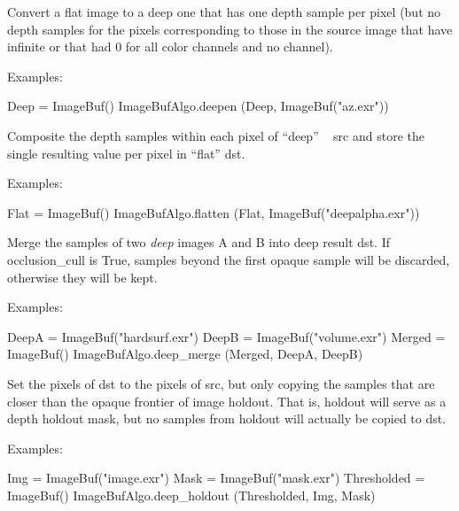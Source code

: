 Convert a flat image to a deep one that has one depth sample per pixel
(but no depth samples for the pixels corresponding to those in the source
image that have infinite  or that had 0 for all color channels and no
 channel).

\smallskip
\noindent Examples:
\begin{code}
    Deep = ImageBuf()
    ImageBufAlgo.deepen (Deep, ImageBuf("az.exr"))
\end{code}
\apiend


  

Composite the depth samples within each pixel of ``deep'' \ImageBuf\ {\cf
src} and store the single  resulting value per pixel in ``flat'' \ImageBuf
{\cf dst}.

\smallskip
\noindent Examples:
\begin{code}
    Flat = ImageBuf()
    ImageBufAlgo.flatten (Flat, ImageBuf("deepalpha.exr"))
\end{code}
\apiend

  

Merge the samples of two \emph{deep} images {\cf A} and {\cf B} into deep
result {\cf dst}. If {\cf occlusion_cull} is {\cf True}, samples beyond
the first opaque sample will be discarded, otherwise they will be kept.

\smallskip
\noindent Examples:
\begin{code}
    DeepA = ImageBuf("hardsurf.exr")
    DeepB = ImageBuf("volume.exr")
    Merged = ImageBuf()
    ImageBufAlgo.deep_merge (Merged, DeepA, DeepB)
\end{code}
\apiend

  

Set the pixels of {\cf dst} to the pixels of {\cf src}, but only copying the
samples that are closer than the opaque frontier of image {\cf holdout}.
That is, {\cf holdout} will serve as a depth holdout mask, but no samples
from {\cf holdout} will actually be copied to {\cf dst}.

\smallskip
\noindent Examples:
\begin{code}
    Img = ImageBuf("image.exr")
    Mask = ImageBuf("mask.exr")
    Thresholded = ImageBuf()
    ImageBufAlgo.deep_holdout (Thresholded, Img, Mask)
\end{code}
\apiend


